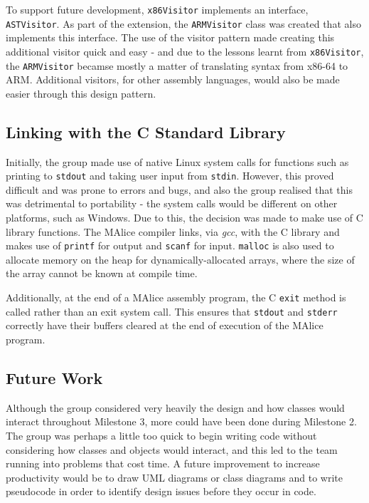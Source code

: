 \documentclass[a4wide, 11pt]{article}
\begin{document}
To support future development, \texttt{x86Visitor} implements an interface,
\texttt{ASTVisitor}. As part of the extension, the \texttt{ARMVisitor} class was
created that also implements this interface. The use of the visitor pattern
made creating this additional visitor quick and easy - and due to the lessons
learnt from \texttt{x86Visitor}, the \texttt{ARMVisitor} becamse mostly a
matter of translating syntax from x86-64 to ARM. Additional visitors, for other
assembly languages, would also be made easier through this design pattern.

\subsection{Linking with the C Standard Library}
Initially, the group made use of native Linux system calls for functions such
as printing to \texttt{stdout} and taking user input from \texttt{stdin}. 
However, this proved difficult and was prone to errors and bugs, and also
the group realised that this was detrimental to portability - the system calls
would be different on other platforms, such as Windows. Due to this, the 
decision was made to make use of C library functions. The MAlice compiler links,
via \emph{gcc}, with the C library and makes use of \texttt{printf} for output
and \texttt{scanf} for input. \texttt{malloc} is also used to allocate memory
on the heap for dynamically-allocated arrays, where the size of the array
cannot be known at compile time. 

Additionally, at the end of a MAlice assembly program, the C \texttt{exit} 
method is called rather than an exit system call. This ensures that 
\texttt{stdout} and \texttt{stderr} correctly have their buffers cleared at the
end of execution of the MAlice program.

\newpage

\subsection{Future Work}

Although the group considered very heavily the design and how classes would
interact throughout Milestone 3, more could have been done during Milestone 2.
The group was perhaps a little too quick to begin writing code without 
considering how classes and objects would interact, and this led to the team 
running into problems that cost time. A future improvement to increase 
productivity would be to draw UML diagrams or class diagrams and to write
pseudocode in order to identify design issues before they occur in code.
\end{document}
